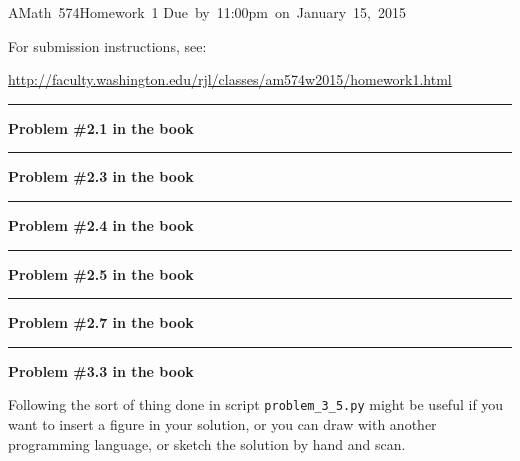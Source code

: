 \documentclass[11pt]{article}
\begin{document}
\hfill\vbox{\hbox{AMath 574}\hbox{Homework 1}
\hbox{Due by 11:00pm on January 15, 2015}}

For submission instructions, see:

\url{http://faculty.washington.edu/rjl/classes/am574w2015/homework1.html}

\vskip 1cm
\hrule
{\bf Problem \#2.1 in the book}





\vskip 1cm
\hrule
{\bf Problem \#2.3 in the book}




\vskip 1cm
\hrule
{\bf Problem \#2.4 in the book}




\vskip 1cm
\hrule
{\bf Problem \#2.5 in the book}




\vskip 1cm
\hrule
{\bf Problem \#2.7 in the book}





\vskip 1cm
\hrule
{\bf Problem \#3.3 in the book}

Following the sort of thing done in 
script \verb+problem_3_5.py+ might be useful if you want to insert a
figure in your solution, or you can draw with another programming language, or
sketch the solution by hand and scan.
\end{document}
